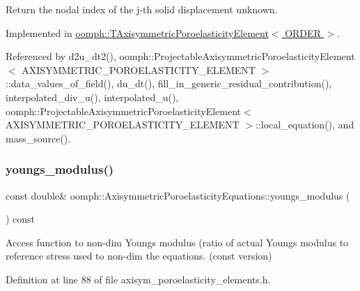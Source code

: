 Return the nodal index of the j-\/th solid displacement unknown. 



Implemented in \hyperlink{classoomph_1_1TAxisymmetricPoroelasticityElement_adcfaa53074c4710fa4c4d34ce37d326c}{oomph\+::\+T\+Axisymmetric\+Poroelasticity\+Element$<$ O\+R\+D\+E\+R $>$}.



Referenced by d2u\+\_\+dt2(), oomph\+::\+Projectable\+Axisymmetric\+Poroelasticity\+Element$<$ A\+X\+I\+S\+Y\+M\+M\+E\+T\+R\+I\+C\+\_\+\+P\+O\+R\+O\+E\+L\+A\+S\+T\+I\+C\+I\+T\+Y\+\_\+\+E\+L\+E\+M\+E\+N\+T $>$\+::data\+\_\+values\+\_\+of\+\_\+field(), du\+\_\+dt(), fill\+\_\+in\+\_\+generic\+\_\+residual\+\_\+contribution(), interpolated\+\_\+div\+\_\+u(), interpolated\+\_\+u(), oomph\+::\+Projectable\+Axisymmetric\+Poroelasticity\+Element$<$ A\+X\+I\+S\+Y\+M\+M\+E\+T\+R\+I\+C\+\_\+\+P\+O\+R\+O\+E\+L\+A\+S\+T\+I\+C\+I\+T\+Y\+\_\+\+E\+L\+E\+M\+E\+N\+T $>$\+::local\+\_\+equation(), and mass\+\_\+source().

\mbox{\label{classoomph_1_1AxisymmetricPoroelasticityEquations_a2e3ac54472beffc980b88db8c071e114}} 
\subsubsection{\texorpdfstring{youngs\+\_\+modulus()}{youngs\_modulus()}}
{\footnotesize\ttfamily const double\& oomph\+::\+Axisymmetric\+Poroelasticity\+Equations\+::youngs\+\_\+modulus (\begin{DoxyParamCaption}{ }\end{DoxyParamCaption}) const\hspace{0.3cm}{\ttfamily [inline]}}



Access function to non-\/dim Young\textquotesingle{}s modulus (ratio of actual Young\textquotesingle{}s modulus to reference stress used to non-\/dim the equations. (const version) 



Definition at line 88 of file axisym\+\_\+poroelasticity\+\_\+elements.\+h.




